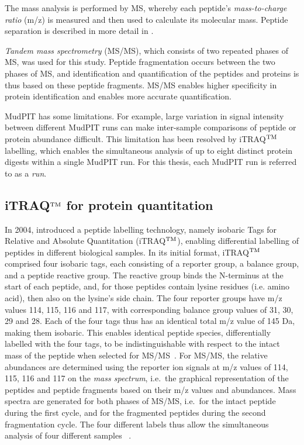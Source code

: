 The mass analysis is performed by MS, whereby each peptide's \emph{mass-to-charge ratio} (m/z) is measured and then used to calculate its molecular mass. Peptide separation is described in more detail in \cite{Eidhammer2008}. 

\emph{Tandem mass spectrometry} (MS/MS), which consists of two repeated phases of MS, was used for this study. Peptide fragmentation occurs between the two phases of MS, and identification and quantification of the peptides and proteins is thus based on these peptide fragments. MS/MS enables higher specificity in protein identification and enables more accurate quantification.

MudPIT has some limitations. For example, large variation in signal intensity between different MudPIT runs can make inter-sample comparisons of peptide or protein abundance difficult. This limitation has been resolved by iTRAQ$^{\rm TM}$ labelling, which enables the simultaneous analysis of up to eight distinct protein digests within a single MudPIT run. For this thesis, each MudPIT run is referred to as a \emph{run}. 

\subsection{iTRAQ$^{\rm TM}$ for protein quantitation}\label{subsec:iTRAQ}
In 2004, \citeauthor{Ross2004} introduced a peptide labelling technology, namely isobaric Tags for Relative and Absolute Quantitation (iTRAQ$^{\rm TM}$), enabling differential labelling of peptides in different biological samples. In its initial format, iTRAQ$^{\rm TM}$ comprised four isobaric tags, each consisting of a reporter group, a balance group, and a peptide reactive group. The reactive group binds the N-terminus at the start of each peptide, and, for those peptides contain lysine residues (i.e. amino acid), then also on the lysine's side chain. The four reporter groups have m/z values 114, 115, 116 and 117, with corresponding balance group values of 31, 30, 29 and 28. Each of the four tags thus has an identical total m/z value of 145 Da, making them isobaric. This enables identical peptide species, differentially labelled with the four tags, to be indistinguishable with respect to the intact mass of the peptide when selected for MS/MS~\citep{Ross2004}. For MS/MS, the relative abundances are determined using the reporter ion signals at m/z values of 114, 115, 116 and 117 on the \emph{mass spectrum}, i.e.\ the graphical representation of the peptides and peptide fragments based on their m/z values and abundances. Mass spectra are generated for both phases of MS/MS, i.e.\ for the intact peptide during the first cycle, and for the fragmented peptides during the second fragmentation cycle. The four different labels thus allow the simultaneous analysis of four different samples ~\citep{Ross2004}.
 
